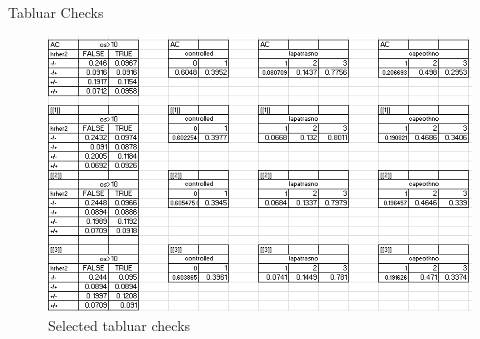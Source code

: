 \begin{frame}{Tabluar Checks}
 \begin{figure}[h!]
  \centering
\includegraphics[width=.8\textwidth]{tabchecks} 
  \caption{Selected tabluar checks}
\label{fig:tabcheck}
\end{figure}

\end{frame}

